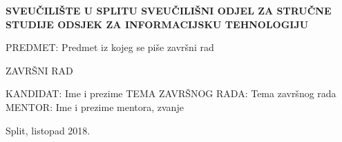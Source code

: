 %
%
\begin{titlepage}
\bfseries
\headerdata
{SVEUČILIŠTE U SPLITU}
{SVEUČILIŠNI ODJEL ZA STRUČNE STUDIJE}
{ODSJEK ZA INFORMACIJSKU TEHNOLOGIJU}

\vspace*{5cm}
\begin{flushleft}
{\Large   PREDMET: Predmet iz kojeg se piše završni rad}
\end{flushleft}
\vspace*{3cm}
\begin{center}
{\Large  ZAVRŠNI RAD}
\end{center}
\vspace*{2cm}

\thesisdata
{KANDIDAT: Ime i prezime}  
{TEMA ZAVRŠNOG RADA: Tema završnog rada}
{MENTOR: Ime i prezime mentora, zvanje}

\begin{center}
\vfill
{\large Split, listopad 2018.}
\end{center}
\end{titlepage}
%
%